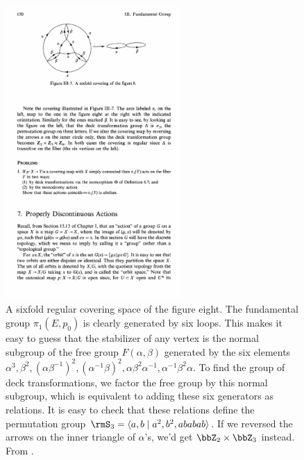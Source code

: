 \begin{figure}[tp]
    \centering
    \includegraphics[width=0.6\textwidth]{figures/sixfold.pdf}
    \caption{A sixfold regular covering space of the figure eight. The fundamental group $\pi_1(E,p_0)$ is clearly generated by six loops. This makes it easy to guess that the stabilizer of any vertex is the normal subgroup of the free group $F(\alpha,\beta)$ generated by the six elements $\alpha^3,\beta^2,\left(\alpha\beta^{-1}\right)^2, \left(\alpha^{-1}\beta\right)^2, \alpha\beta^2\alpha^{-1}, \alpha^{-1}\beta^2\alpha$. To find the group of deck transformations, we factor the free group by this normal subgroup, which is equivalent to adding these six generators as relations. It is easy to check that these relations define the permutation group $\rmS_3=\langle a,b\mid a^2,b^2,ababab\rangle$. If we reversed the arrows on the inner triangle of $\alpha$'s, we'd get $\bbZ_2\times \bbZ_3$ instead. From \cite[Fig.~III-7]{Bredon}.}
    \label{fig:sixfold covering}
\end{figure}

